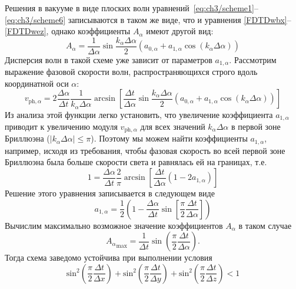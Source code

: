 Решения в вакууме в виде плоских волн уравнений~\eqref{eq:ch3/scheme1}--\eqref{eq:ch3/scheme6} записываются в таком же виде, что и уравнения \eqref{FDTDwbx}--\eqref{FDTDwez}, однако коэффициенты $A_\alpha$ имеют другой вид:
\begin{equation}
    A_\alpha = \frac{1}{\Delta\alpha}\sin{\frac{k_\alpha\Delta \alpha}{2}} \left( a_{0,\alpha}+a_{1,\alpha}\cos{(k_\alpha\Delta\alpha)} \right)
\end{equation}
Дисперсия волн в такой схеме уже зависит от параметров $a_{1,\alpha}$.
Рассмотрим выражение фазовой скорости волн, распространяющихся строго вдоль координатной оси $\alpha$:
\begin{equation}
    v_{\mathrm{ph},\alpha} = 2\frac{\Delta \alpha}{\Delta t}\frac{1}{k_\alpha \Delta \alpha} \arcsin{\left[\frac{\Delta t}{\Delta\alpha}\sin{\frac{k_\alpha\Delta \alpha}{2}} \left( a_{0,\alpha}+a_{1,\alpha}\cos{(k_\alpha\Delta\alpha)}\right) \right]}    
\end{equation}
Из анализа этой функции легко установить, что увеличение коэффициента $a_{1,\alpha}$ приводит к увеличению модуля $v_{\mathrm{ph},\alpha}$ для всех значений $k_\alpha \Delta\alpha$ в первой зоне Бриллюэна ($|k_\alpha \Delta\alpha| \leq \pi$).
Поэтому мы можем найти коэффициенты $a_{1,\alpha}$, например, исходя из требования, чтобы фазовая скорость во всей первой зоне Бриллюэна была больше скорости света и равнялась ей на границах, т.е.
\begin{equation}
    1 = \frac{\Delta \alpha}{\Delta t}\frac{2}{\pi} \arcsin{\left[\frac{\Delta t}{\Delta\alpha}\left( 1 - 2 a_{1,\alpha}\right) \right]}
\end{equation}
Решение этого уравнения записывается в следующем виде
\begin{equation}
    a_{1,\alpha} = \frac{1}{2} \left( 1 - \frac{\Delta \alpha}{\Delta t} \sin{ \left[ \frac{\pi}{2} \frac{\Delta t}{\Delta \alpha} \right]} \right)
\end{equation}
Вычислим максимально возможное значение коэффициентов $A_\alpha$ в таком случае
\begin{equation}
    {A_\alpha}_\mathrm{max} = \frac{1}{\Delta t} \sin{ \left( \frac{\pi}{2} \frac{\Delta t}{\Delta \alpha} \right) }.
\end{equation}
Тогда схема заведомо устойчива при выполнении условия
\begin{equation}
    \text{sin}^2 \left( \frac{\pi}{2} \frac{\Delta t}{\Delta x} \right) + \text{sin}^2 \left( \frac{\pi}{2} \frac{\Delta t}{\Delta y} \right) + \text{sin}^2 \left( \frac{\pi}{2} \frac{\Delta t}{\Delta z} \right) < 1
\end{equation}

